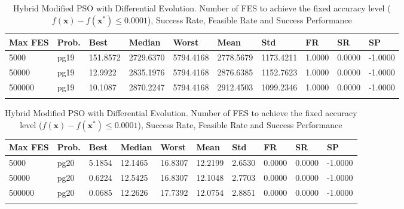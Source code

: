 \documentclass[10pt, a4paper]{book}
\begin{document}
\begin{center}
\begin{longtable}{l l l l l l l l l l}
\textbf{Max FES} & \textbf{Prob.} & \textbf{Best} & \textbf{Median} & \textbf{Worst} & \textbf{Mean} & \textbf{Std} & \textbf{FR} & \textbf{SR} & \textbf{SP} \\
\hline
5000 & pg19 & 151.8572 & 2729.6370 & 5794.4168 & 2778.5679 & 1173.4211 & 1.0000 & 0.0000 & -1.0000 \\
50000 & pg19 & 12.9922 & 2835.1976 & 5794.4168 & 2876.6385 & 1152.7623 & 1.0000 & 0.0000 & -1.0000 \\
500000 & pg19 & 10.1087 & 2870.2247 & 5794.4168 & 2912.4503 & 1099.2346 & 1.0000 & 0.0000 & -1.0000 \\

\caption{ Hybrid Modified PSO with Differential Evolution. Number of FES to achieve the fixed accuracy level ($f(\mathbf{x}) - f(\mathbf{x}^{*}) \leq 0.0001$), Success Rate, Feasible Rate and Success Performance }
\end{longtable}
\end{center}

\begin{center}
\begin{longtable}{l l l l l l l l l l}
\textbf{Max FES} & \textbf{Prob.} & \textbf{Best} & \textbf{Median} & \textbf{Worst} & \textbf{Mean} & \textbf{Std} & \textbf{FR} & \textbf{SR} & \textbf{SP} \\
\hline
5000 & pg20 & 5.1854 & 12.1465 & 16.8307 & 12.2199 & 2.6530 & 0.0000 & 0.0000 & -1.0000 \\
50000 & pg20 & 0.6224 & 12.5425 & 16.8307 & 12.1048 & 2.7703 & 0.0000 & 0.0000 & -1.0000 \\
500000 & pg20 & 0.0685 & 12.2626 & 17.7392 & 12.0754 & 2.8851 & 0.0000 & 0.0000 & -1.0000 \\

\caption{ Hybrid Modified PSO with Differential Evolution. Number of FES to achieve the fixed accuracy level ($f(\mathbf{x}) - f(\mathbf{x}^{*}) \leq 0.0001$), Success Rate, Feasible Rate and Success Performance }
\end{longtable}
\end{center}
\end{document}
